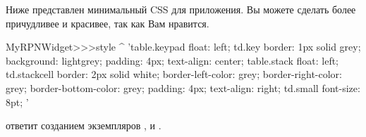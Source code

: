 \documentclass[a4paper,10pt,twoside]{book}
\begin{document}



Ниже представлен минимальный CSS для приложения. Вы можете сделать
более причудливее и красивее, так как Вам нравится.

\begin{code}{}
MyRPNWidget>>>style
	^ 'table.keypad { float: left; }
td.key {
	border: 1px solid grey;
	background: lightgrey;
	padding: 4px;
	text-align: center;
}
table.stack { float: left; }
td.stackcell {
	border: 2px solid white;
	border-left-color: grey;
	border-right-color: grey;
	border-bottom-color: grey;
	padding: 4px;
	text-align: right;
}
td.small { font-size: 8pt; }'
\end{code}




 ответит созданием экземпляров ,
 и .

\end{document}
